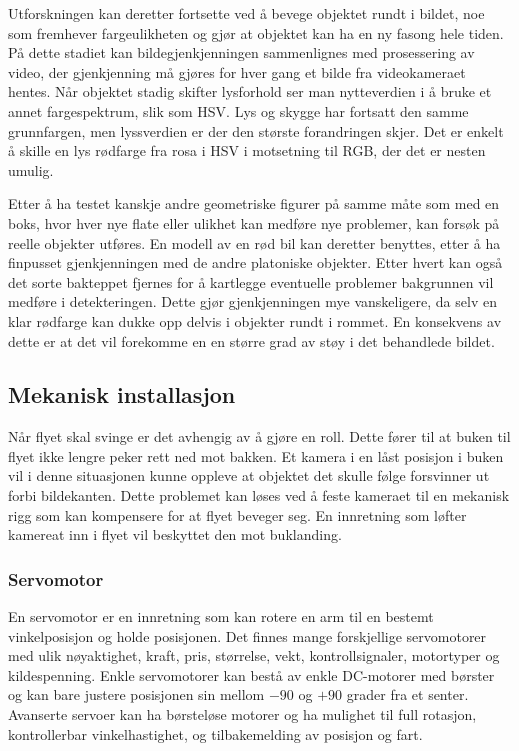 Utforskningen kan deretter fortsette ved å bevege objektet rundt i bildet, noe som fremhever fargeulikheten og gjør at objektet kan ha en ny fasong hele tiden. På dette stadiet kan bildegjenkjenningen sammenlignes med prosessering av video, der gjenkjenning må gjøres for hver gang et bilde fra videokameraet hentes. Når objektet stadig skifter lysforhold ser man nytteverdien i å bruke et annet fargespektrum, slik som HSV. Lys og skygge har fortsatt den samme grunnfargen, men lyssverdien er der den største forandringen skjer. Det er enkelt å skille en lys rødfarge fra rosa i HSV i motsetning til RGB, der det er nesten umulig. 

Etter å ha testet kanskje andre geometriske figurer på samme måte som med en boks, hvor hver nye flate eller ulikhet kan medføre nye problemer, kan forsøk på reelle objekter utføres. En modell av en rød bil kan deretter benyttes, etter å ha finpusset gjenkjenningen med de andre platoniske objekter. Etter hvert kan også det sorte bakteppet fjernes for å kartlegge eventuelle problemer bakgrunnen vil medføre i detekteringen. Dette gjør gjenkjenningen mye vanskeligere, da selv en klar rødfarge kan dukke opp delvis i objekter rundt i rommet. En konsekvens av dette er at det vil forekomme en en større grad av støy i det behandlede bildet.  

\subsection{Mekanisk installasjon}
Når flyet skal svinge er det avhengig av å gjøre en roll. Dette fører til at buken til flyet ikke lengre peker rett ned mot bakken. Et kamera i en låst posisjon i buken vil i denne situasjonen kunne oppleve at objektet det skulle følge forsvinner ut forbi bildekanten. Dette problemet kan løses ved å feste kameraet til en mekanisk rigg som kan kompensere for at flyet beveger seg. En innretning som løfter kamereat inn i flyet vil beskyttet den mot buklanding. 


\subsubsection{Servomotor}

En servomotor er en innretning som kan rotere en arm til en bestemt vinkelposisjon og holde posisjonen. Det finnes mange forskjellige servomotorer med ulik nøyaktighet, kraft, pris, størrelse, vekt, kontrollsignaler, motortyper og kildespenning. Enkle servomotorer kan bestå av enkle DC-motorer med børster og kan bare justere posisjonen sin mellom $-90$ og $+90$ grader fra et senter. Avanserte servoer kan ha børsteløse motorer og ha mulighet til full rotasjon, kontrollerbar vinkelhastighet, og tilbakemelding av posisjon og fart.


